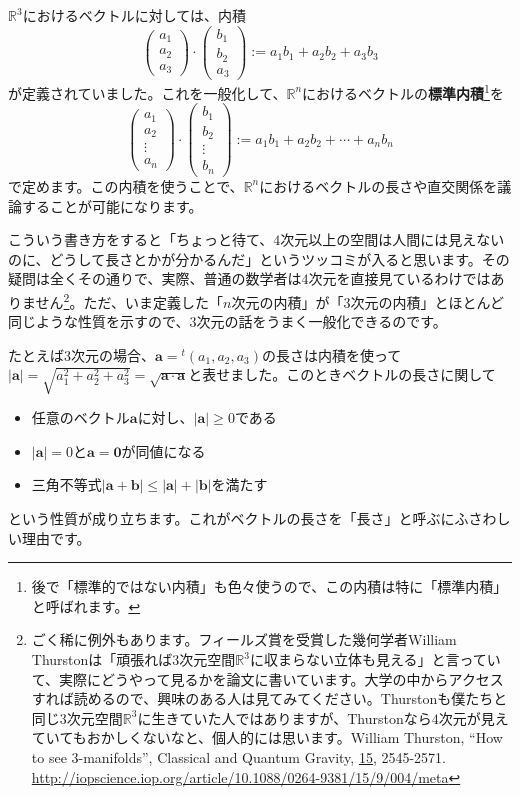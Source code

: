 $\mathbb{R}^3$におけるベクトルに対しては、内積
\[
\begin{pmatrix}
a_1 \\
a_2 \\
a_3
\end{pmatrix}
\cdot
\begin{pmatrix}
b_1 \\
b_2 \\
a_3
\end{pmatrix}
:= a_1 b_1 + a_2 b_2 + a_3 b_3
\]
が定義されていました。これを一般化して、$\mathbb{R}^n$におけるベクトルの\textbf{標準内積}\footnote{後で「標準的ではない内積」も色々使うので、この内積は特に「標準内積」と呼ばれます。}を
\[
\begin{pmatrix}
a_1 \\
a_2 \\
\vdots \\
a_n
\end{pmatrix}
\cdot
\begin{pmatrix}
b_1 \\
b_2 \\
\vdots \\
b_n
\end{pmatrix}
:= a_1 b_1 + a_2 b_2 + \cdots + a_n b_n
\]
で定めます。この内積を使うことで、$\mathbb{R}^n$におけるベクトルの長さや直交関係を議論することが可能になります。

こういう書き方をすると「ちょっと待て、$4$次元以上の空間は人間には見えないのに、どうして長さとかが分かるんだ」というツッコミが入ると思います。その疑問は全くその通りで、実際、普通の数学者は$4$次元を直接見ているわけではありません\footnote{ごく稀に例外もあります。フィールズ賞を受賞した幾何学者William Thurstonは「頑張れば$3$次元空間$\mathbb{R}^3$に収まらない立体も見える」と言っていて、実際にどうやって見るかを論文に書いています。大学の中からアクセスすれば読めるので、興味のある人は見てみてください。Thurstonも僕たちと同じ$3$次元空間$\mathbb{R}^3$に生きていた人ではありますが、Thurstonなら$4$次元が見えていてもおかしくないなと、個人的には思います。William Thurston, ``How to see 3-manifolds'', Classical and Quantum Gravity, \underline{15}, 2545-2571.\\ \url{http://iopscience.iop.org/article/10.1088/0264-9381/15/9/004/meta}}。ただ、いま定義した「$n$次元の内積」が「$3$次元の内積」とほとんど同じような性質を示すので、$3$次元の話をうまく一般化できるのです。

たとえば$3$次元の場合、$\bm{a} = {}^t(a_1, a_2, a_3)$の長さは内積を使って$|\bm{a}| = \sqrt{a_1^2 + a_2^2 + a_3^2} = \sqrt{\bm{a} \cdot \bm{a}}$と表せました。このときベクトルの長さに関して
\begin{itemize}
\item 任意のベクトル$\bm{a}$に対し、$|\bm{a}| \geq 0$である
\item $|\bm{a}| = 0$と$\bm{a} = \bm{0}$が同値になる
\item 三角不等式$|\bm{a} + \bm{b}| \leq |\bm{a}| + |\bm{b}|$を満たす
\end{itemize}
という性質が成り立ちます。これがベクトルの長さを「長さ」と呼ぶにふさわしい理由です。

